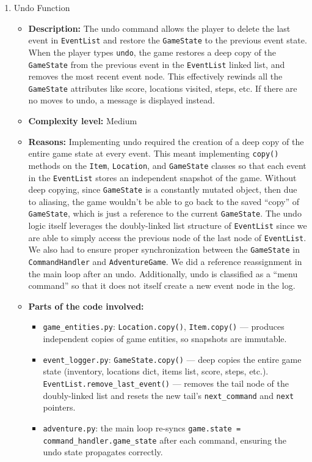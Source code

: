 \documentclass[11pt]{article}
\begin{document}
\begin{enumerate}
    \item Undo Function
    \begin{itemize}
        \item \textbf{Description:} The undo command allows the player to delete the last event in \verb|EventList| and restore the \verb|GameState| to the previous event state. When the player types \verb|undo|, the game restores a deep copy of the \verb|GameState| from the previous event in the \verb|EventList| linked list, and removes the most recent event node. This effectively rewinds all the \verb|GameState| attributes like score, locations visited, steps, etc. If there are no moves to undo, a message is displayed instead.

        \item \textbf{Complexity level:} Medium

        \item \textbf{Reasons:} Implementing undo required the creation of a deep copy of the entire game state at every event. This meant implementing \verb|copy()| methods on the \verb|Item|, \verb|Location|, and \verb|GameState| classes so that each event in the \verb|EventList| stores an independent snapshot of the game. Without deep copying, since \verb|GameState| is a constantly mutated object, then due to aliasing, the game wouldn't be able to go back to the saved ``copy'' of \verb|GameState|, which is just a reference to the current \verb|GameState|. The undo logic itself leverages the doubly-linked list structure of \verb|EventList| since we are able to simply access the previous node of the last node of \verb|EventList|. We also had to ensure proper synchronization between the \verb|GameState| in \verb|CommandHandler| and \verb|AdventureGame|. We did a reference reassignment in the main loop after an undo. Additionally, undo is classified as a ``menu command'' so that it does not itself create a new event node in the log.

        \item \textbf{Parts of the code involved:}
        \begin{itemize}
            \item \verb|game_entities.py|: \verb|Location.copy()|, \verb|Item.copy()| --- produces independent copies of game entities, so snapshots are immutable.
            \item \verb|event_logger.py|: \verb|GameState.copy()| --- deep copies the entire game state (inventory, locations dict, items list, score, steps, etc.). \verb|EventList.remove_last_event()| --- removes the tail node of the doubly-linked list and resets the new tail's \verb|next_command| and \verb|next| pointers.
            \item \verb|adventure.py|: the main loop re-syncs \verb|game.state = command_handler.game_state| after each command, ensuring the undo state propagates correctly.
        \end{itemize}


\end{itemize}
\end{enumerate}
\end{document}
